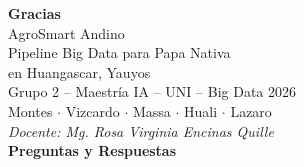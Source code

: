 \documentclass[14pt,aspectratio=169]{beamer}
\begin{document}
\begin{frame}[plain]
  \begin{tcolorbox}[colback=agroverde, colframe=agroverde,
      coltext=white, center, valign=center,
      height=0.85\textheight]
    \centering
    \vspace{0.5cm}
    {\huge\bfseries Gracias}\\[0.5em]
    {\large\color{agroclear} AgroSmart Andino}\\[0.2em]
    {\normalsize Pipeline Big Data para Papa Nativa\\en Huangascar, Yauyos}\\[0.8em]

    {\small Grupo 2 -- Maestr\'ia IA -- UNI -- Big Data 2026}\\[0.2em]
    {\small Montes $\cdot$ Vizcardo $\cdot$ Massa $\cdot$
      Huali $\cdot$ Lazaro}\\[0.5em]
    {\small\itshape Docente: Mg. Rosa Virginia Encinas Quille}\\[0.8em]

    {\large\bfseries\color{agroclear} Preguntas y Respuestas}
  \end{tcolorbox}
\end{frame}
\end{document}
